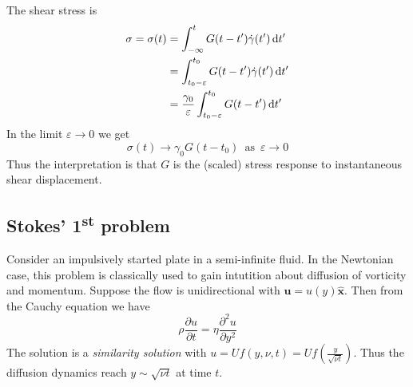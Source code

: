 \documentclass{jknotes}
\begin{document}
\begin{center}
	\qquad
\end{center}

The shear stress is
\begin{align}
	\sigma = \sigma(t) &= \int_{-\infty}^t G(t-t') \srate(t') \, \diffd t' \\
													 &=
	\int_{t_0-\varepsilon}^{t_0} G(t-t') \srate(t') \, \diffd t' \\
	&= \frac{\gamma_0}{\varepsilon} \int_{t_0-\varepsilon}^{t_0} G(t-t') \,
	\diffd t'
\end{align}
In the limit $\varepsilon \to 0$ we get
\begin{equation}
	\sigma(t) \to \gamma_0 G(t-t_0) \,\,\,\text{as}\,\,\, \varepsilon \to 0
\end{equation}
Thus the interpretation is that $G$ is the (scaled) stress response to
instantaneous shear displacement.

\subsection{Stokes' 1\textsuperscript{st} problem}
Consider an impulsively started plate in a semi-infinite fluid. In the
Newtonian case, this problem is classically used to gain intutition about
diffusion of vorticity and momentum. Suppose the flow is unidirectional with
$\symbf{u} = u(y) \hat{\symbf{x}}$. Then from the Cauchy equation we have
\begin{equation}
	\rho \frac{\partial u}{\partial t} = \eta \frac{\partial^2 u}{\partial
	y^2} 
\end{equation}
The solution is a \emph{similarity solution} with $u = Uf(y,\nu,t) =
Uf(\frac{y}{\sqrt{\nu t}})$. Thus the diffusion dynamics reach $y \sim
\sqrt{\nu t}$ at time $t$.
\end{document}
